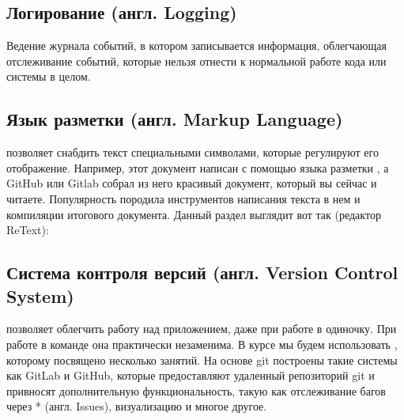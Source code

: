 \documentclass[letterpaper,10pt,russian]{sphinxmanual}
\begin{document}
\sphinxAtStartPar
{}


\subsection{Логирование (англ. Logging)}
\label{\detokenize{educational_materials/terms/content:logging}}
\sphinxAtStartPar
Ведение журнала событий, в котором записывается информация, облегчающая отслеживание событий, которые нельзя отнести к нормальной работе кода или системы в целом.


\subsection{Язык разметки (англ. Markup Language)}
\label{\detokenize{educational_materials/terms/content:markup-language}}
\sphinxAtStartPar
{} позволяет снабдить текст специальными символами, которые регулируют его отображение. Например, этот документ написан с помощью языка разметки , а GitHub или Gitlab собрал из него красивый документ, который вы сейчас и читаете. Популярность  породила  инструментов написания текста в нем и компиляции итогового документа. Данный раздел выглядит вот так (редактор ReText):

\sphinxAtStartPar
{}


\subsection{Система контроля версий (англ. Version Control System)}
\label{\detokenize{educational_materials/terms/content:version-control-system}}
\sphinxAtStartPar
{} позволяет облегчить работу над приложением, даже при работе в одиночку. При работе в команде она практически незаменима. В курсе мы будем использовать , которому посвящено несколько занятий. На основе git построены такие системы как GitLab и GitHub, которые предоставляют удаленный репозиторий git и привносят дополнительную функциональность, такую как отслеживание багов через * (англ. Issues), визуализацию и многое другое.
\end{document}
